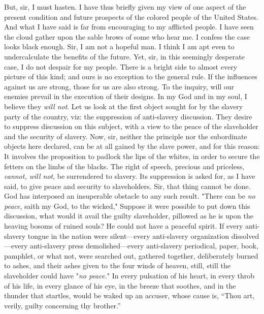 But, sir, I must hasten. I have thus briefly given my view of one aspect
of the present condition and future prospects of the colored people of
the United States. And what I have said is far from encouraging to my
afflicted people. I have seen the cloud gather upon the sable brows of
some who hear me. I confess the case looks black enough. Sir, I am not a
hopeful man. I think I am apt even to undercalculate the benefits of the
future. Yet, sir, in this seemingly desperate case, I do not despair for
my people. There is a bright side to almost every picture of this kind;
and ours is no exception to the general rule. If the influences against
us are strong, those for us are also strong. To the inquiry, will our
enemies prevail in the execution of their designs. In my God and in my
soul, I believe they \emph{will not}. Let us look at the first object
sought for by the slavery party of the country, viz: the suppression of
anti-slavery discussion. They desire to suppress discussion on this
subject, with a view to the peace of the slaveholder and the security of
slavery. Now, sir, neither the principle nor the subordinate objects
here declared, can be at all gained by the slave power, and for this
reason: It involves the proposition to padlock the lips of the whites,
in order to secure the fetters on the limbs of the blacks. The right of
speech, precious and priceless, \emph{cannot, will not}, be surrendered
to slavery. Its suppression is asked for, as I have said, to give peace
and security to slaveholders. Sir, that thing cannot be done. God has
interposed an insuperable obstacle to any such result. "There can be
\emph{no peace}, saith my God, to the wicked,"
{\protect\hypertarget{456}{}{}}Suppose it were possible to put down this
discussion, what would it avail the guilty slaveholder, pillowed as he
is upon the heaving bosoms of ruined souls? He could not have a peaceful
spirit. If every anti-slavery tongue in the nation were silent---every
anti-slavery organization dissolved---every anti-slavery press
demolished---every anti-slavery periodical, paper, book, pamphlet, or
what not, were searched out, gathered together, deliberately burned to
ashes, and their ashes given to the four winds of heaven, still, still
the slaveholder could have "\emph{no peace.}" In every pulsation of his
heart, in every throb of his life, in every glance of his eye, in the
breeze that soothes, and in the thunder that startles, would be waked up
an accuser, whose cause is, ``Thou art, verily, guilty concerning thy
brother.''

{\protect\hypertarget{ux5cux7bux5cux7bux5cux7b1ux5cux7dux5cux7dux5cux7d}{}{}}

